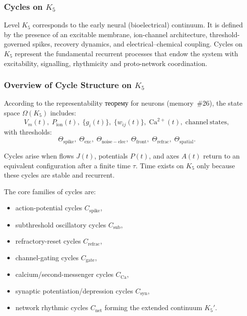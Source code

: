 
\subsubsection{Cycles on \texorpdfstring{$K_5$}{K_5}}
\label{sec:cycles-k5}

Level $K_5$ corresponds to the early neural (bioelectrical) continuum.
It is defined by the presence of an excitable membrane, ion-channel
architecture, threshold-governed spikes, recovery dynamics, and
electrical–chemical coupling.  
Cycles on $K_5$ represent the fundamental recurrent processes that endow
the system with excitability, signalling, rhythmicity and proto-network
coordination.

\subsubsection{Overview of Cycle Structure on \texorpdfstring{$K_5$}{K_5}}

According to the representability теорему for neurons (memory~\#26),
the state space $\Omega(K_5)$ includes:
\[
  V_m(t),\;
  P_{\mathrm{ion}}(t),\;
  \{g_i(t)\},\;
  \{w_{ij}(t)\},\;
  \mathrm{Ca}^{2+}(t),\;
  \mathrm{channel\ states},
\]
with thresholds:
\[
  \Theta_{\mathrm{spike}},\;
  \Theta_{\mathrm{exc}},\;
  \Theta_{\mathrm{noise-elec}},\;
  \Theta_{\mathrm{front}},\;
  \Theta_{\mathrm{refrac}},\;
  \Theta_{\mathrm{spatial}}.
\]

Cycles arise when flows $J(t)$, potentials $P(t)$, and axes $A(t)$
return to an equivalent configuration after a finite time $\tau$.
Time exists on $K_5$ only because these cycles are stable and recurrent.

The core families of cycles are:

\begin{itemize}
  \item action-potential cycles $C_{\mathrm{spike}}$,
  \item subthreshold oscillatory cycles $C_{\mathrm{sub}}$,
  \item refractory-reset cycles $C_{\mathrm{refrac}}$,
  \item channel-gating cycles $C_{\mathrm{gate}}$,
  \item calcium/second-messenger cycles $C_{\mathrm{Ca}}$,
  \item synaptic potentiation/depression cycles $C_{\mathrm{syn}}$,
  \item network rhythmic cycles $C_{\mathrm{net}}$ forming the extended continuum $K_5'$.
\end{itemize}

